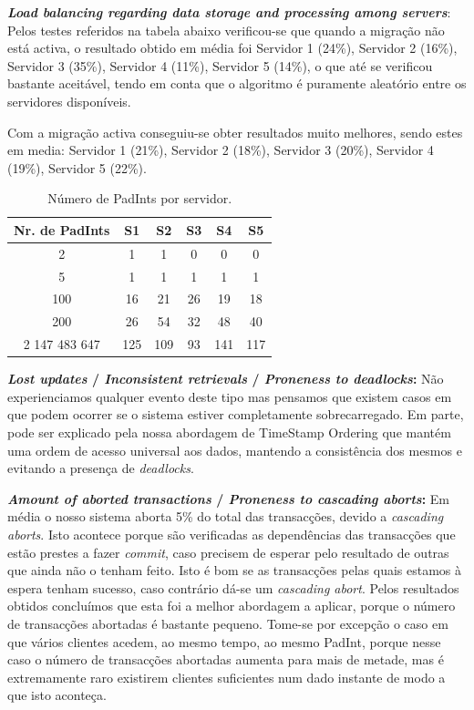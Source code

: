 \begin{description}
\item{\textbf{\textit{Load balancing regarding data storage and processing among servers}}:}
Pelos testes referidos na tabela abaixo verificou-se que quando a migração não está activa, o resultado obtido em média foi Servidor 1 (24\%), Servidor 2 (16\%), Servidor 3 (35\%), Servidor 4 (11\%), Servidor 5 (14\%), o que até se verificou bastante aceitável, tendo em conta que o algoritmo é puramente aleatório entre os servidores disponíveis.

Com a migração activa conseguiu-se obter resultados muito melhores, sendo estes em media: Servidor 1 (21\%), Servidor 2 (18\%), Servidor 3 (20\%), Servidor 4 (19\%), Servidor 5 (22\%).

\begin{table}[htb]
\centering
\begin{tabular}{c|c|c|c|c|c}
\textbf{Nr. de PadInts} &  \textbf{S1} &  \textbf{S2} & \textbf{S3} & \textbf{S4} & \textbf{S5} \\\hline
2 & 1 & 1 & 0 & 0 & 0\\
5 & 1 & 1 & 1 & 1 & 1\\
100 & 16 & 21 & 26 & 19 & 18\\
200 & 26 & 54 & 32 & 48 & 40\\
2 147 483 647 & 125 & 109 & 93 & 141 & 117\\
\end{tabular}
\caption{\label{tab:balanceamento}Número de PadInts por servidor.}
\end{table}

\item{\textbf{\textit{Lost updates} / \textit{Inconsistent retrievals} / \textit{Proneness to deadlocks}:}} 
Não experienciamos qualquer evento deste tipo mas pensamos que existem casos em que podem ocorrer se o sistema estiver completamente sobrecarregado. Em parte, pode ser explicado pela nossa abordagem de TimeStamp Ordering\cite{ex1} que mantém uma ordem de acesso universal aos dados, mantendo a consistência dos mesmos e evitando a presença de \textit{deadlocks}.

\item{\textbf{\textit{Amount of aborted transactions} / \textit{Proneness to cascading aborts}:}} 
Em média o nosso sistema aborta 5\% do total das transacções, devido a \textit{cascading aborts}. Isto acontece porque são verificadas as dependências das transacções que estão prestes a fazer \textit{commit}, caso precisem de esperar pelo resultado de outras que ainda não o tenham feito. Isto é bom se as transacções pelas quais estamos à espera tenham sucesso, caso contrário dá-se um \textit{cascading abort}. Pelos resultados obtidos concluímos que esta foi a melhor abordagem a aplicar, porque o número de transacções abortadas é bastante pequeno. Tome-se por excepção o caso em que vários clientes acedem, ao mesmo tempo, ao mesmo PadInt, porque nesse caso o número de transacções abortadas aumenta para mais de metade, mas é extremamente raro existirem clientes suficientes num dado instante de modo a que isto aconteça.

\end{description}